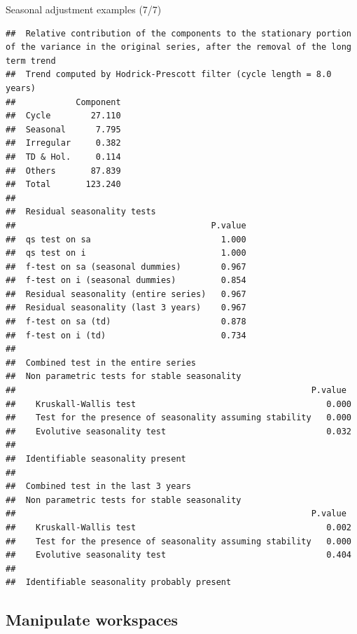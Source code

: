 \documentclass[10pt,xcolor=table,color={dvipsnames,usenames},ignorenonframetext,usepdftitle=false,french]{beamer}
\newenvironment{Shaded}{\begin{snugshade}}{\end{snugshade}}
\newcommand{\KeywordTok}[1]{\textcolor[rgb]{0.13,0.29,0.53}{\textbf{#1}}}
\newcommand{\DataTypeTok}[1]{\textcolor[rgb]{0.13,0.29,0.53}{#1}}
\newcommand{\OtherTok}[1]{\textcolor[rgb]{0.56,0.35,0.01}{#1}}
\newcommand{\OperatorTok}[1]{\textcolor[rgb]{0.81,0.36,0.00}{\textbf{#1}}}
\newcommand{\NormalTok}[1]{#1}
\begin{document}
\begin{frame}[fragile]{Seasonal adjustment examples (7/7)}

\footnotesize

\begin{Shaded}
\end{Shaded}

\begin{verbatim}
##  Relative contribution of the components to the stationary portion of the variance in the original series, after the removal of the long term trend 
##  Trend computed by Hodrick-Prescott filter (cycle length = 8.0 years)
##            Component
##  Cycle        27.110
##  Seasonal      7.795
##  Irregular     0.382
##  TD & Hol.     0.114
##  Others       87.839
##  Total       123.240
## 
##  Residual seasonality tests 
##                                       P.value
##  qs test on sa                          1.000
##  qs test on i                           1.000
##  f-test on sa (seasonal dummies)        0.967
##  f-test on i (seasonal dummies)         0.854
##  Residual seasonality (entire series)   0.967
##  Residual seasonality (last 3 years)    0.967
##  f-test on sa (td)                      0.878
##  f-test on i (td)                       0.734
## 
##  Combined test in the entire series 
##  Non parametric tests for stable seasonality
##                                                           P.value
##    Kruskall-Wallis test                                      0.000
##    Test for the presence of seasonality assuming stability   0.000
##    Evolutive seasonality test                                0.032
##  
##  Identifiable seasonality present
## 
##  Combined test in the last 3 years 
##  Non parametric tests for stable seasonality
##                                                           P.value
##    Kruskall-Wallis test                                      0.002
##    Test for the presence of seasonality assuming stability   0.000
##    Evolutive seasonality test                                0.404
##  
##  Identifiable seasonality probably present
\end{verbatim}

\end{frame}

\subsection{Manipulate workspaces}\label{manipulate-workspaces}
\end{document}
